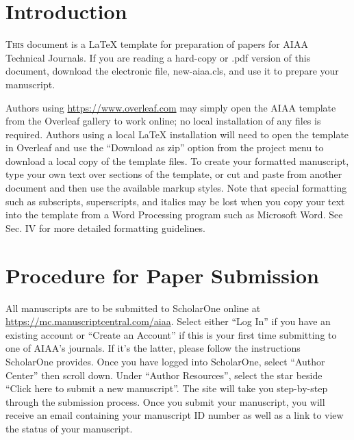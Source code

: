\documentclass[journal ]{new-aiaa}
\begin{document}
\addtocounter{table}{-1}


\section{Introduction}
\lettrine{T}{his} document is a \LaTeX{} template for preparation of papers for AIAA Technical Journals. If you are reading a hard-copy or .pdf version of this document, download the electronic file, new-aiaa.cls, and use it to prepare your manuscript.

Authors using \url{https://www.overleaf.com} may simply open the AIAA template from the Overleaf gallery to work online; no local installation of any files is required. Authors using a local \LaTeX{} installation will need to open the template in Overleaf and use the ``Download as zip'' option from the project menu to download a local copy of the template files. To create your formatted manuscript, type your own text over sections of the template, or cut and paste from another document and then use the available markup styles. Note that special formatting such as subscripts, superscripts, and italics may be lost when you copy your text into the template from a Word Processing program such as Microsoft Word. See Sec. IV for more detailed formatting guidelines.


\section{Procedure for Paper Submission}

All manuscripts are to be submitted to ScholarOne online at \url{https://mc.manuscriptcentral.com/aiaa}. Select either “Log In” if you have an existing account or “Create an Account” if this is your first time submitting to one of AIAA’s journals. If it’s the latter, please follow the instructions ScholarOne provides. Once you have logged into ScholarOne, select “Author Center” then scroll down. Under “Author Resources”, select the star beside “Click here to submit a new manuscript”. The site will take you step-by-step through the submission process. Once you submit your manuscript, you will receive an email containing your manuscript ID number as well as a link to view the status of your manuscript. 
\end{document}
